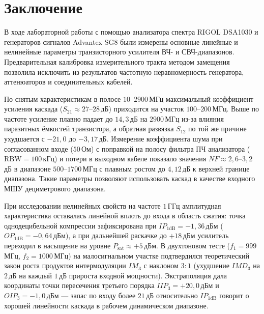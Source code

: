 \section{Заключение}

В ходе лабораторной работы с помощью анализатора спектра RIGOL DSA1030 и генераторов сигналов Advantex SG8 были измерены основные линейные и нелинейные параметры транзисторного усилителя ВЧ- и СВЧ-диапазонов. Предварительная калибровка измерительного тракта методом замещения позволила исключить из результатов частотную неравномерность генератора, аттенюаторов и соединительных кабелей.

По снятым характеристикам в полосе $10\text{--}2900$\,МГц максимальный коэффициент усиления каскада ($S_{21} \approx 27\text{--}28$\,дБ) приходится на участок $100\text{--}200$\,МГц. Выше по частоте усиление плавно падает до $14{,}3$\,дБ на $2900$\,МГц из-за влияния паразитных ёмкостей транзистора, а обратная развязка $S_{12}$ по той же причине ухудшается с $-21{,}0$ до $-3{,}17$\,дБ. Измерение коэффициента шума при согласованном входе ($50$\,Ом) с поправкой на полосу фильтра ПЧ анализатора ($\text{RBW} = 100$\,кГц) и потери в выходном кабеле показало значения $NF \approx 2{,}6\text{--}3{,}2$\,дБ в диапазоне $500\text{--}1700$\,МГц с плавным ростом до $4{,}12$\,дБ к верхней границе диапазона. Такие параметры позволяют использовать каскад в качестве входного МШУ дециметрового диапазона.

При исследовании нелинейных свойств на частоте $1$\,ГГц амплитудная характеристика оставалась линейной вплоть до входа в область сжатия: точка однодецибельной компрессии зафиксирована при $IP_{1\text{dB}} = -1{,}36$\,дБм ($OP_{1\text{dB}} = -0{,}64$\,дБм), а при дальнейшей раскачке до $+18$\,дБм усилитель переходил в насыщение на уровне $P_{\text{sat}} \approx +5$\,дБм. В двухтоновом тесте ($f_1 = 999$\,МГц, $f_2 = 1000$\,МГц) на малосигнальном участке подтвердился теоретический закон роста продуктов интермодуляции $IM_3$ с наклоном $3:1$ (ухудшение $IMD_3$ на $2$\,дБ на каждый $1$\,дБ прироста входной мощности). Экстраполяция дала координаты точки пересечения третьего порядка $IIP_3 = +20{,}0$\,дБм и $OIP_3 = -1{,}0$\,дБм — запас по входу более $21$\,дБ относительно $IP_{1\text{dB}}$ говорит о хорошей линейности каскада в рабочем динамическом диапазоне.